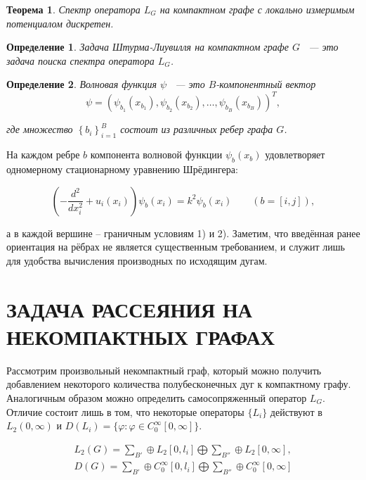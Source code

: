 \documentclass[a4 paper, 12 pt]{extarticle}
\newtheorem{theorem}{Теорема}[section]
\newtheorem{Def}{Определение}[section]
\begin{document}
  \begin{theorem}
	Спектр оператора $L_{G}$ на компактном графе с локально измеримым
	потенциалом дискретен.
  \end{theorem}

  \begin{Def}
  	Задача Штурма-Лиувилля на компактном графе $G$ ~--- это задача поиска спектра оператора $L_{G}$.
  \end{Def}

  \begin{Def}
  	Волновая функция $\psi$ ~--- это $B$-компонентный вектор $$\psi=\left(\psi_{b_1}(x_{b_1}),
  	\psi_{b_2}(x_{b_2}),\ldots,\psi_{b_B}(x_{b_B})\right)^T,$$
  	
  	где множество $\left\{b_i\right\}_{i=1}^{B}$ состоит из различных
  	ребер графа $G$.
  \end{Def}

  На каждом ребре $b$ компонента волновой функции $\psi_b(x_b)$
  удовлетворяет одномерному стационарному уравнению Шрёдингера:

  \begin{equation}\label{Shred1}
   \left(-\frac{d^2}{dx_i^2} +
    u_i(x_i)\right)\psi_b(x_{i})=k^2\psi_b(x_{i})\qquad(b=[i,j]),
  \end{equation}

  а в каждой вершине -- граничным условиям 1) и 2). Заметим, что
  введённая ранее ориентация на рёбрах не является существенным
  требованием, и служит лишь для удобства вычисления производных по
  исходящим дугам.
  
  \pagebreak
  
  \section{ЗАДАЧА РАССЕЯНИЯ НА НЕКОМПАКТНЫХ ГРАФАХ}
  
  Рассмотрим произвольный некомпактный граф, который можно получить добавлением некоторого количества полубесконечных дуг к компактному графу.
  Аналогичным образом можно определить самосопряженный оператор
  $L_G$. Отличие состоит лишь в том, что некоторые операторы
  $\{L_i\}$ действуют в $L_2(0, \infty)$ и
  $D(L_i)=\{\varphi:\varphi\in C_0^\infty[0,\infty]\}$.
  
  \begin{gather*}
  L_2(G)=\sum_{B'}\oplus L_2[0, l_i]\bigoplus\sum_{B''}\oplus
  L_2[0,\infty],
  \\
  D(G)=\sum_{B'}\oplus C_0^\infty[0,l_i]\bigoplus\sum_{B''}\oplus
  C_0^\infty[0,\infty]
  \end{gather*}
  
\end{document}
